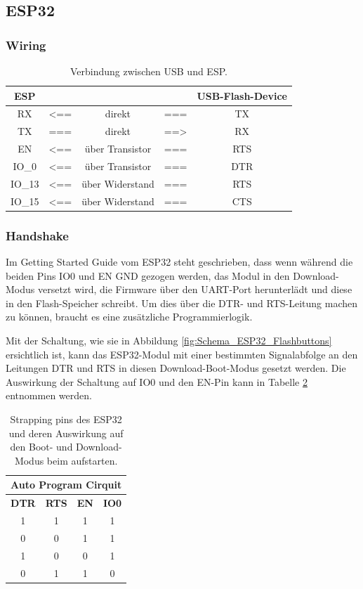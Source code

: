 \subsection{ESP32}\label{Appendix:Handshake_ESP}

\subsubsection{Wiring}\label{Appendix:Handshake_ESP_wiring}
\begin{table}[H]
\center
\begin{tabular}{|c|lcl|c|}
\hline
\textbf{ESP} & & & & \textbf{USB-Flash-Device} \\ \hline
RX & <== & direkt & === & TX  \\
TX & === & direkt & ==> & RX  \\
EN & <== & über Transistor & === & RTS \\
IO\_0 & <== & über Transistor & === & DTR \\
IO\_13 & <== & über Widerstand & === & RTS \\
IO\_15 & <== & über Widerstand & === & CTS \\
\hline
\end{tabular}
\caption{Verbindung zwischen USB und ESP.}
\label{tab:USB_ESP}
\end{table}

\subsubsection{Handshake}\label{Appendix:Handshake_ESP_Messung}

Im Getting Started Guide vom ESP32 steht geschrieben, dass wenn während die beiden Pins IO0 und EN GND gezogen werden, das Modul in den Download-Modus versetzt wird, die Firmware über den UART-Port herunterlädt und diese in den Flash-Speicher schreibt. Um dies über die DTR- und RTS-Leitung machen zu können, braucht es eine zusätzliche Programmierlogik.

Mit der Schaltung, wie sie in Abbildung \ref{fig:Schema_ESP32_Flashbuttons} ersichtlich ist, kann das ESP32-Modul mit einer bestimmten Signalabfolge an den Leitungen DTR und RTS in diesen Download-Boot-Modus gesetzt werden. Die Auswirkung der Schaltung auf IO0 und den EN-Pin kann in Tabelle \ref{tab:Einfluss_Boot_Schaltung} entnommen werden.

\begin{table}[H]
\center
\begin{tabular}{|c|c||c|c|}
\hline
\multicolumn{4}{|c|}{\textbf{Auto Program Cirquit}}\\
\hline
\textbf{DTR} & \textbf{RTS} & \textbf{EN} & \textbf{IO0} \\
\hline
1 & 1 & 1 & 1 \\
\hline
0 & 0 & 1 & 1 \\
\hline
1 & 0 & 0 & 1 \\
\hline
0 & 1 & 1 & 0 \\
\hline
\end{tabular}

\caption{Strapping pins des ESP32 und deren Auswirkung auf den Boot- und Download-Modus beim aufstarten.}
\label{tab:Einfluss_Boot_Schaltung}
\end{table}

